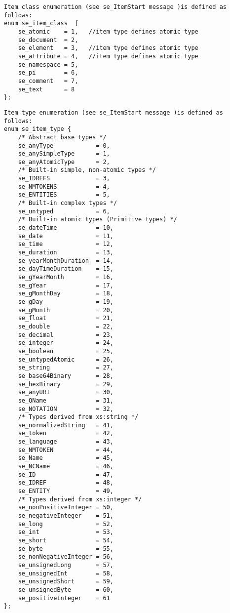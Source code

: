 \documentclass[a4paper,12pt]{article}
\begin{document}
\begin{verbatim}
Item class enumeration (see se_ItemStart message )is defined as follows:
enum se_item_class  {
    se_atomic    = 1,   //item type defines atomic type
    se_document  = 2,
    se_element   = 3,   //item type defines atomic type
    se_attribute = 4,   //item type defines atomic type
    se_namespace = 5,
    se_pi        = 6,
    se_comment   = 7,
    se_text      = 8
};
\end{verbatim}

\begin{verbatim}
Item type enumeration (see se_ItemStart message )is defined as follows:
enum se_item_type {
    /* Abstract base types */
    se_anyType            = 0,
    se_anySimpleType      = 1,
    se_anyAtomicType      = 2,
    /* Built-in simple, non-atomic types */
    se_IDREFS             = 3,
    se_NMTOKENS           = 4,
    se_ENTITIES           = 5,
    /* Built-in complex types */
    se_untyped            = 6,
    /* Built-in atomic types (Primitive types) */
    se_dateTime           = 10,
    se_date               = 11,
    se_time               = 12,
    se_duration           = 13,
    se_yearMonthDuration  = 14,
    se_dayTimeDuration    = 15,
    se_gYearMonth         = 16,
    se_gYear              = 17,
    se_gMonthDay          = 18,
    se_gDay               = 19,
    se_gMonth             = 20,
    se_float              = 21,
    se_double             = 22,
    se_decimal            = 23,
    se_integer            = 24,
    se_boolean            = 25,
    se_untypedAtomic      = 26,
    se_string             = 27,
    se_base64Binary       = 28,
    se_hexBinary          = 29,
    se_anyURI             = 30,
    se_QName              = 31,
    se_NOTATION           = 32,
    /* Types derived from xs:string */
    se_normalizedString   = 41,
    se_token              = 42,
    se_language           = 43,
    se_NMTOKEN            = 44,
    se_Name               = 45,
    se_NCName             = 46,
    se_ID                 = 47,
    se_IDREF              = 48,
    se_ENTITY             = 49,
    /* Types derived from xs:integer */
    se_nonPositiveInteger = 50,
    se_negativeInteger    = 51,
    se_long               = 52,
    se_int                = 53,
    se_short              = 54,
    se_byte               = 55,
    se_nonNegativeInteger = 56,
    se_unsignedLong       = 57,
    se_unsignedInt        = 58,
    se_unsignedShort      = 59,
    se_unsignedByte       = 60,
    se_positiveInteger    = 61
};
\end{verbatim}
\end{document}
